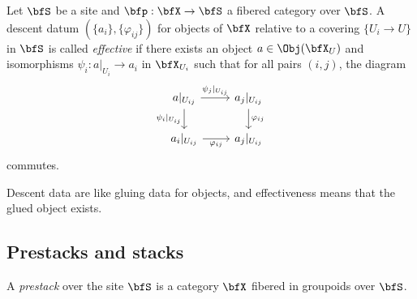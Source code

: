     \begin{example}\label{eg:descent_data_for_presheaves}
    \end{example}

    \begin{definition}\label{def:effective_descent_data_in_categories}
        Let \(\bfS\) be a site and \(\bfp: \bfX \to \bfS\) a fibered category over \(\bfS\).
        A descent datum \((\{ a_i \}, \{ \varphi_{ij} \})\) for objects of \(\bfX\) relative to a covering \(\{ U_i \to U \}\) in \(\bfS\) is called \emph{effective} if there exists an object \(a \in \Obj(\bfX_U)\) and isomorphisms \(\psi_i: a|_{U_i} \to a_i\) in \(\bfX_{U_i}\) such that for all pairs \((i,j)\), the diagram
        \[ \begin{tikzcd}
            a|_{U_{ij}} \arrow[r, "\psi_j|_{U_{ij}}"] \arrow[d, "\psi_i|_{U_{ij}}"'] & a_j|_{U_{ij}} \arrow[d, "\varphi_{ij}"] \\
            a_i|_{U_{ij}} \arrow[r, "\varphi_{ij}"'] & a_j|_{U_{ij}}
        \end{tikzcd} \]
        commutes.
    \end{definition}

    \begin{slogan}\label{slogan:descent_data_and_effectiveness}
        Descent data are like gluing data for objects, and effectiveness means that the glued object exists.
    \end{slogan}


\subsection{Prestacks and stacks}



    \begin{definition}\label{def:prestacks_as_functor}
        A \emph{prestack} over the site \(\bfS\) is a category \(\bfX\) fibered in groupoids over \(\bfS\).
    \end{definition}


